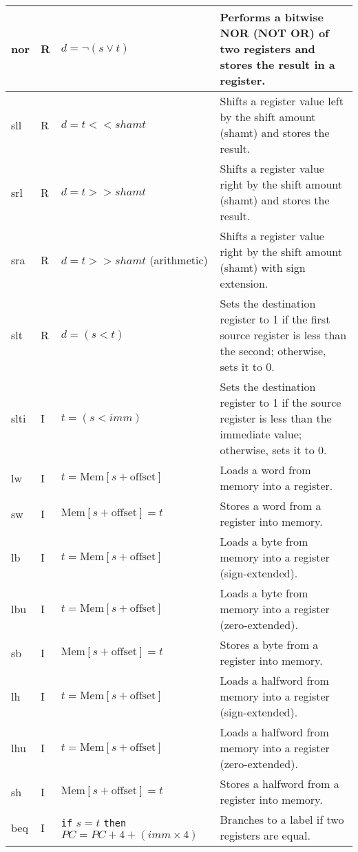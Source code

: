 \documentclass[12pt]{article}
\theoremstyle{definition}
\begin{document}
\begin{longtable}{|l|l|p{6cm}|p{6cm}|}
    \hline
    nor  & R  & \raggedright $d = \lnot(s \lor t)$ & Performs a bitwise NOR (NOT OR) of two registers and stores the result in a register. \\
    \hline
    sll  & R  & \raggedright $d = t << shamt$ & Shifts a register value left by the shift amount (shamt) and stores the result. \\
    \hline
    srl  & R  & \raggedright $d = t >> shamt$ & Shifts a register value right by the shift amount (shamt) and stores the result. \\
    \hline
    sra  & R  & \raggedright $d = t >> shamt$ (arithmetic) & Shifts a register value right by the shift amount (shamt) with sign extension. \\
    \hline
    slt  & R  & \raggedright $d = (s < t)$ & Sets the destination register to 1 if the first source register is less than the second; otherwise, sets it to 0. \\
    \hline
    slti & I  & \raggedright $t = (s < imm)$ & Sets the destination register to 1 if the source register is less than the immediate value; otherwise, sets it to 0. \\
    \hline
    lw   & I  & \raggedright $t = \text{Mem}[s + \text{offset}]$ & Loads a word from memory into a register. \\
    \hline
    sw   & I  & \raggedright $\text{Mem}[s + \text{offset}] = t$ & Stores a word from a register into memory. \\
    \hline
    lb   & I  & \raggedright $t = \text{Mem}[s + \text{offset}]$ & Loads a byte from memory into a register (sign-extended). \\
    \hline
    lbu  & I  & \raggedright $t = \text{Mem}[s + \text{offset}]$ & Loads a byte from memory into a register (zero-extended). \\
    \hline
    sb   & I  & \raggedright $\text{Mem}[s + \text{offset}] = t$ & Stores a byte from a register into memory. \\
    \hline
    lh   & I  & \raggedright $t = \text{Mem}[s + \text{offset}]$ & Loads a halfword from memory into a register (sign-extended). \\
    \hline
    lhu  & I  & \raggedright $t = \text{Mem}[s + \text{offset}]$ & Loads a halfword from memory into a register (zero-extended). \\
    \hline
    sh   & I  & \raggedright $\text{Mem}[s + \text{offset}] = t$ & Stores a halfword from a register into memory. \\
    \hline
    beq  & I  & \raggedright \texttt{if} $s = t$ \texttt{then} $PC = PC + 4 + (imm \times 4)$ & Branches to a label if two registers are equal. \\

\end{longtable}
\end{document}
